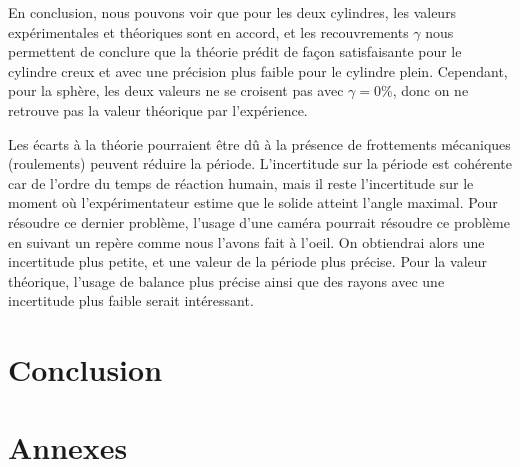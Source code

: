 \documentclass[12pt]{article}
\begin{document}
En conclusion, nous pouvons voir que pour les deux cylindres, les valeurs expérimentales et théoriques sont en accord, et les recouvrements $\gamma$
nous permettent de conclure que la théorie prédit de façon satisfaisante pour le cylindre creux et avec une précision plus faible pour le cylindre plein.
Cependant, pour la sphère, les deux valeurs ne se croisent pas avec $\gamma = 0\%$, donc on ne retrouve pas la valeur théorique par l'expérience.

Les écarts à la théorie pourraient être dû à la présence de frottements mécaniques (roulements) peuvent réduire la période. L'incertitude sur la période est cohérente car de l'ordre 
du temps de réaction humain, mais il reste l'incertitude sur le moment où l'expérimentateur estime que le solide atteint l'angle maximal. Pour résoudre ce dernier problème,
l'usage d'une caméra pourrait résoudre ce problème en suivant un repère comme nous l'avons fait à l'oeil. On obtiendrai alors une incertitude plus petite, et une
valeur de la période plus précise. Pour la valeur théorique, l'usage de balance plus précise ainsi que des rayons avec une incertitude plus faible serait intéressant.

\section{Conclusion}

\break
\section{Annexes}
\end{document}
